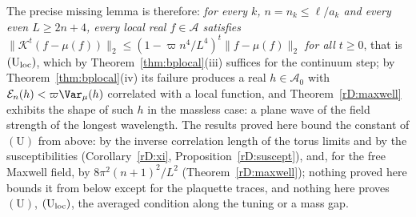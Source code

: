 \begin{remark}
The precise missing lemma is therefore: \emph{for every $k$, $n=n_k\le
\ell/a_k$ and every even $L\ge2n+4$, every local real $f\in\mathcal A$
satisfies $\lVert\mathcal K^t(f-\mu(f))\rVert_2\le(1-\varpi n^4
/L^4)^t\lVert f-\mu(f)\rVert_2$ for all $t\ge0$}, that is
$(\mathrm U_{\rm loc})$, which by Theorem~\ref{thm:bplocal}(iii) suffices
for the continuum step; by Theorem~\ref{thm:bplocal}(iv) its failure
produces a real $h\in\mathcal A_0$ with $\mathcal E_n(h)<\varpi\Var_\mu(h)$
correlated with a local function, and Theorem~\ref{rD:maxwell} exhibits
the shape of such $h$ in the massless case: a plane wave of the field
strength of the longest wavelength. The results proved here bound the
constant of $(\mathrm U)$ from above: by the inverse correlation length of
the torus limits and by the susceptibilities (Corollary~\ref{rD:xi},
Proposition~\ref{rD:suscept}), and, for the free Maxwell field, by
$8\pi^2(n+1)^2/L^2$ (Theorem~\ref{rD:maxwell}); nothing proved here bounds
it from below except for the plaquette traces, and nothing here proves
$(\mathrm U)$, $(\mathrm U_{\rm loc})$, the averaged condition along the
tuning or a mass gap.
\end{remark}
